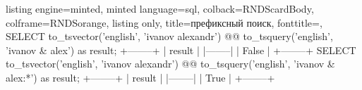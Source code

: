 \begin{frame}[fragile, t]
    \begin{tcblisting}{
      listing engine=minted,
      minted language=sql,
      colback=RNDScardBody,
      colframe=RNDSorange,
      listing only,
      title=префиксный поиск,
      fonttitle=\normalsize,
    }
SELECT to_tsvector('english', 'ivanov alexandr')  @@ 
  to_tsquery('english', 'ivanov & alex') as result;
+--------+
| result |
|--------|
| False  |
+--------+
SELECT to_tsvector('english', 'ivanov alexandr')  @@ 
  to_tsquery('english', 'ivanov & alex:*') as result;
+--------+
| result |
|--------|
| True   |
+--------+
  \end{tcblisting}
\end{frame}
